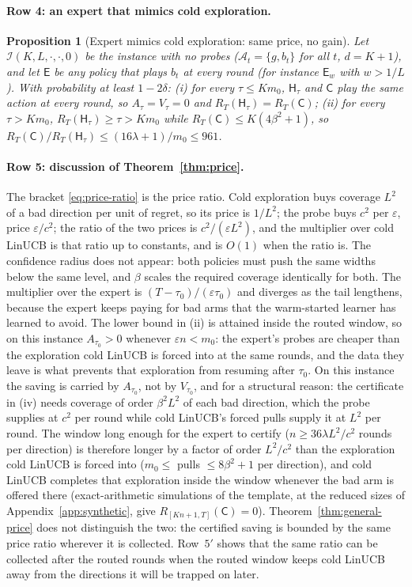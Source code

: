 \documentclass{article}
\newtheorem{proposition}{Proposition}
\theoremstyle{definition}
\theoremstyle{remark}
\newcommand{\eps}{\varepsilon}
\theoremstyle{remark}
\newcommand{\Cold}{\mathsf{C}}
\newcommand{\Exp}{\mathsf{E}}
\newcommand{\Hyb}{\mathsf{H}}
\begin{document}
\paragraph{Row 4: an expert that mimics cold exploration.}
\begin{proposition}[Expert mimics cold exploration: same price, no gain]
\label{prop:cat-mimic}
Let $\mathcal I(K,L,\cdot,\cdot,0)$ be the instance with no probes
($\mathcal A_t=\{g,b_t\}$ for all $t$, $d=K+1$), and let $\Exp$ be any policy
that plays $b_t$ at every round (for instance $\Exp_w$ with $w>1/L$). With
probability at least $1-2\delta$: (i) for every $\tau\le Km_0$,
$\Hyb_\tau$ and $\Cold$ play the same action at every round, so
$A_\tau=V_\tau=0$ and $R_T(\Hyb_\tau)=R_T(\Cold)$; (ii) for every
$\tau>Km_0$, $R_T(\Hyb_\tau)\ge\tau>Km_0$ while $R_T(\Cold)\le K(4\beta^2+1)$,
so $R_T(\Cold)/R_T(\Hyb_\tau)\le(16\lambda+1)/m_0\le961$.
\end{proposition}

\paragraph{Row 5: discussion of Theorem~\ref{thm:price}.}
The bracket \eqref{eq:price-ratio} is the price ratio. Cold exploration buys
coverage $L^2$ of a bad direction per unit of regret, so its price is $1/L^2$;
the probe buys $c^2$ per $\eps$, price $\eps/c^2$; the ratio of the two prices
is $c^2/(\eps L^2)$, and the multiplier over cold LinUCB is that ratio up to
constants, and is $O(1)$ when the ratio is. The confidence radius does not
appear: both policies must push the same widths below the same level, and
$\beta$ scales the required coverage identically for both. The multiplier
over the expert is $(T-\tau_0)/(\eps\tau_0)$ and diverges as the tail
lengthens, because the expert keeps paying for bad arms that the warm-started
learner has learned to avoid. The lower bound in (ii) is attained inside the
routed window, so on this instance $A_{\tau_0}>0$ whenever $\eps n<m_0$: the
expert's probes are cheaper than the exploration cold LinUCB is forced into
at the same rounds, and the data they leave is what prevents that exploration
from resuming after $\tau_0$. On this instance the saving is carried by
$A_{\tau_0}$, not by $V_{\tau_0}$, and for a structural reason: the
certificate in (iv) needs coverage of order $\beta^2L^2$ of each bad
direction, which the probe supplies at $c^2$ per round while cold LinUCB's
forced pulls supply it at $L^2$ per round. The window long enough for the
expert to certify ($n\ge36\lambda L^2/c^2$ rounds per direction) is therefore
longer by a factor of order $L^2/c^2$ than the exploration cold LinUCB is
forced into ($m_0\le$ pulls $\le 8\beta^2+1$ per direction), and cold LinUCB
completes that exploration inside the window whenever the bad arm is offered
there (exact-arithmetic simulations of the template, at the reduced sizes of
Appendix~\ref{app:synthetic}, give $R_{[Kn+1,T]}(\Cold)=0$). Theorem~\ref{thm:general-price}
does not distinguish the two: the certified saving is bounded by the
same price ratio wherever it is collected. Row~$5'$ shows that the same ratio
can be collected after the routed rounds when the routed window keeps cold
LinUCB away from the directions it will be trapped on later.
\end{document}

